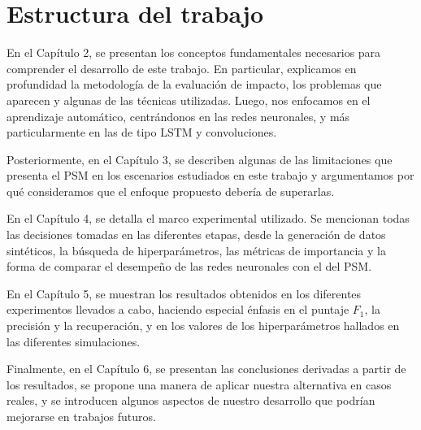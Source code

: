 \documentclass[../main.tex]{subfiles}
\begin{document}


\section{Estructura del trabajo}
En el Capítulo 2, se presentan los conceptos fundamentales necesarios para comprender el
desarrollo de este trabajo. En particular, explicamos en profundidad la metodología de la
evaluación de impacto, los problemas que aparecen y algunas de las técnicas utilizadas.
Luego, nos enfocamos en el aprendizaje automático, centrándonos en las redes neuronales, y
más particularmente en las de tipo LSTM y convoluciones.

Posteriormente, en el Capítulo 3, se describen algunas de las limitaciones que presenta el
PSM en los escenarios estudiados en este trabajo y argumentamos por qué consideramos que
el enfoque propuesto debería de superarlas.

En el Capítulo 4, se detalla el marco experimental utilizado. Se mencionan todas las
decisiones tomadas en las diferentes etapas, desde la generación de datos sintéticos, la
búsqueda de hiperparámetros, las métricas de importancia y la forma de comparar el
desempeño de las redes neuronales con el del PSM.

En el Capítulo 5, se muestran los resultados obtenidos en los diferentes experimentos
llevados a cabo, haciendo especial énfasis en el puntaje \(F_1\), la precisión y la
recuperación, y en los valores de los hiperparámetros hallados en las diferentes
simulaciones.

Finalmente, en el Capítulo 6, se presentan las conclusiones derivadas a partir de los
resultados, se propone una manera de aplicar nuestra alternativa en casos reales, y se
introducen algunos aspectos de nuestro desarrollo que podrían mejorarse en trabajos
futuros.
\end{document}

